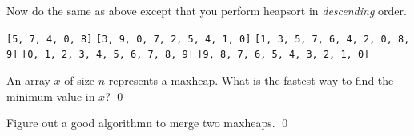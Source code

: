 \newpage
\begin{ex}
  Now do the same as above
  except that you perform heapsort in \textit{descending} order.
\begin{tightlist}
  \li \verb![5, 7, 4, 0, 8]!
  \li \verb![3, 9, 0, 7, 2, 5, 4, 1, 0]!
  \li \verb![1, 3, 5, 7, 6, 4, 2, 0, 8, 9]!
  \li \verb![0, 1, 2, 3, 4, 5, 6, 7, 8, 9]!
  \li \verb![9, 8, 7, 6, 5, 4, 3, 2, 1, 0]!
\end{tightlist}
\end{ex}


\newpage
\begin{ex}
An array $x$ of size $n$ represents a maxheap.
What is the fastest way to find the minimum value in $x$?
\qed
\end{ex}


\newpage
\begin{ex}
Figure out a good algorithmn to merge two maxheaps.
\qed
\end{ex}


